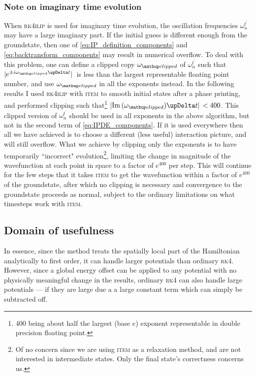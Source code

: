 \subsubsection{Note on imaginary time evolution}

When \textsc{rk4ilip} is used for imaginary time evolution, the oscillation frequencies $\omega_n^{t^\prime}$ may have a large imaginary part. If the initial guess is different enough from the groundstate, then one of \eqref{eq:IP_definition_components} and \eqref{eq:backtransform_components} may result in numerical overflow. To deal with this problem, one can define a clipped copy $\omega_\up{clipped}$ of $\omega_n^{t^\prime}$ such that $\abs*{e^{\pm i\omega_\up{clipped}\upDelta t}}$ is less than the largest representable floating point number, and use $\omega_\up{clipped}$ in all the exponents instead. In the following results I used \textsc{rk4ilip} with \textsc{item} to smooth initial states after a phase printing, and performed clipping such that\footnote{$400$ being about half the largest (base $e$) exponent representable in double precision floating point.} {$\abs*{\im{(\omega_\up{clipped})}\upDelta t} < 400$}. This clipped version of $\omega_n^{t^\prime}$ should be used in all exponents in the above algorithm, but not in the second term of \eqref{eq:IPDE_components}. If it is used everywhere then all we have achieved is to choose a different (less useful) interaction picture, and will still overflow. What we achieve by clipping only the exponents is to have temporarily ``incorrect" evolution\footnote{Of no concern since we are using \textsc{item} as a relaxation method, and are not interested in intermediate states. Only the final state's correctness concerns us.}, limiting the change in magnitude of the wavefunction at each point in space to a factor of $e^{400}$ per step. This will continue for the few steps that it takes \textsc{item} to get the wavefunction within a factor of $e^{400}$ of the groundstate, after which no clipping is necessary and convergence to the groundstate proceeds as normal, subject to the ordinary limitations on what timesteps work with \textsc{item}.

\subsection{Domain of usefulness}

 In essence, since the method treats the spatially local part of the Hamiltonian analytically to first order, it can handle larger potentials than ordinary \textsc{rk4}. However, since a global energy offset can be applied to any potential with no physically meaningful change in the results, ordinary \textsc{rk4} can also handle large potentials --- if they are large due a a large constant term which can simply be subtracted off.

